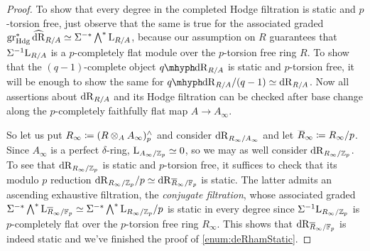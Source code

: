 \documentclass[DIV=12,numbers=enddot,leqno,bibliography=totoc]{scrartcl}
\begin{document}
	\begin{proof}
		To show that every degree in the completed Hodge filtration is static and $p$-torsion free, just observe that the same is true for the associated graded $\gr_{\Hodge}^*\hatdeRham_{R/A}\simeq \Sigma^{-*}\bigwedge^*\L_{R/A}$, because our assumption on $R$ guarantees that $\Sigma^{-1}\mathrm{L}_{R/A}$ is a $p$-completely flat module over the $p$-torsion free ring $R$. To show that the $(q-1)$-complete object $\qdeRham_{R/A}$ is static and $p$-torsion free, it will be enough to show the same for $\qdeRham_{R/A}/(q-1)\simeq \deRham_{R/A}$. Now all assertions about $\mathrm{dR}_{R/A}$ and its Hodge filtration can be checked after base change along the $p$-completely faithfully flat map $A\rightarrow A_\infty$.
		
		So let us put $R_\infty\coloneqq (R\otimes_A A_\infty)_p^\complete$ and consider $\mathrm{dR}_{R_\infty/A_\infty}$ and let $\ov R_\infty\coloneqq R_\infty/p$. Since $A_\infty$ is a perfect $\delta$-ring, $\mathrm{L}_{A_\infty/\mathbb{Z}_p}\simeq 0$, so we may as well consider $\mathrm{dR}_{R_\infty/\mathbb{Z}_p}$. To see that $\mathrm{dR}_{R_\infty/\mathbb{Z}_p}$ is static and $p$-torsion free, it suffices to check that its modulo $p$ reduction $\deRham_{R_\infty/\IZ_p}/p\simeq \deRham_{\ov R_\infty/\IF_p}$ is static. The latter admits an ascending exhaustive filtration, the \emph{conjugate filtration}, whose associated graded $\Sigma^{-*}\bigwedge^*\L_{\ov R_\infty/\IF_p}\simeq \Sigma^{-*}\bigwedge^*\L_{R_\infty/\IZ_p}/p$ is static in every degree since $\Sigma^{-1}\mathrm{L}_{R_\infty/\mathbb{Z}_p}$ is $p$-completely flat over the $p$-torsion free ring $R_\infty$. This shows that $\deRham_{\ov R_\infty/\IF_p}$ is indeed static and we've finished the proof of \cref{enum:deRhamStatic}.
		

\end{proof}
\end{document}
